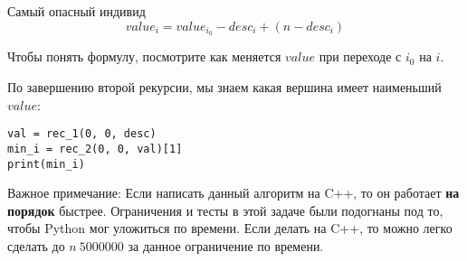 \begin{tutorial}{Самый опасный индивид}
$$ value_i = value_{i_0} - desc_i + (n - desc_i) $$

Чтобы понять формулу, посмотрите как меняется $value$ при переходе с $i_0$ на $i$. 

По завершению второй рекурсии, мы знаем какая вершина имеет наименьший $value$:

\begin{verbatim}
val = rec_1(0, 0, desc)  
min_i = rec_2(0, 0, val)[1]  
print(min_i)
\end{verbatim}



Важное примечание: Если написать данный алгоритм на C++, то он работает \textbf{на порядок} быстрее. Ограничения и тесты в этой задаче были подогнаны под то, чтобы Python мог уложиться по времени. Если делать на C++, то можно легко сделать до $n ~ 5 000 000 $ за данное ограничение по времени.      
 



\end{tutorial}
